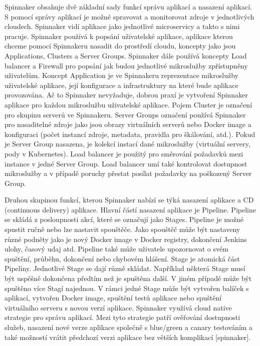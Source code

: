 Spinnaker obsahuje dvě základní sady funkcí správu aplikací a nasazení aplikací. S pomocí správy aplikací je možné spravovat a monitorovat zdroje v jednotlivých cloudech. Spinnaker vidí aplikace jako jednotlivé microservicy a takto s nimi pracuje. Spinnaker používá k popsání uživatelské aplikace, aplikace kterou chceme pomocí Spinnakeru nasadit do prostředí cloudu, koncepty jako jsou Applications, Clusters a Server Groups. Spinnaker dále používá koncepty Load balancer a Firewall pro popsání jak budou jednotlivé mikroslužby zpřístupněny uživatelům. Koncept Application je ve Spinnakeru reprezentace mikroslužby uživatelské aplikace, její konfigurace a infrastruktury na které bude aplikace provozována. Ač to Spinnaker nevyžaduje, dobrou praxí je vytvoření Spinnaker aplikace pro každou mikroslužbu uživatelské aplikace. Pojem Cluster je označení pro skupinu serverů ve Spinnakeru. Server Groups označení používá Spinnaker pro nasaditelné zdroje jako jsou obrazy virtuálních serverů nebo Docker image a konfiguraci (počet instancí zdroje, metadata, pravidla pro škálování, atd.). Pokud je Server Group nasazena, je kolekcí instací dané mikroslužby (virtuální servery, pody v Kubernetes). Load balancer je použitý pro směrování požadavků mezi instance v jedné Server Group. Load balancer umí také kontrolovat dostupnost mikroslužby a v případě poruchy přestat posílat požadavky na poškozený Server Group.\par
Druhou skupinou funkcí, kterou Spinnaker nabízí se týká nasazení aplikace a CD (continuous delivery) aplikace. Hlavní částí nasazení aplikace je Pipeline. Pipeline se skládá z posloupnosti akcí, které se označují jako Stages. Pipeline je možné spustit ručně nebo lze nastavit spouštěče. Jako spouštěč může být nastaveny různé podněty jako je nový Docker image v Docker registry, dokončení Jenkins ulohy, časový udaj atd. Pipeline také může uživatele upozornovat o svém spuštění, průběhu, dokončení nebo chybovém hlášení. Stage je atomická část Pipeliny. Jednotlivé Stage se dají různě skládat. Například některá Stage musí být uspěšně dokončena předtím než je spuštěna další. V jiném případě může být spuštěno více Stagí najednou. V rámci jedné Stage může být vytvořen balíček s aplikací, vytvořen Docker image, spuštění testů aplikace nebo  spuštění virtuálního serveru s novou verzí aplikace. Spinnaker využívá cloud native strategie pro správu aplikací. Mezi tyto strategie patří ověřování dostupnosti služeb, nasazení nové verze aplikace společně s blue/green a canary testováním a také možností vrátit předchozí verzi aplikace bez větších komplikací [spinnaker].

